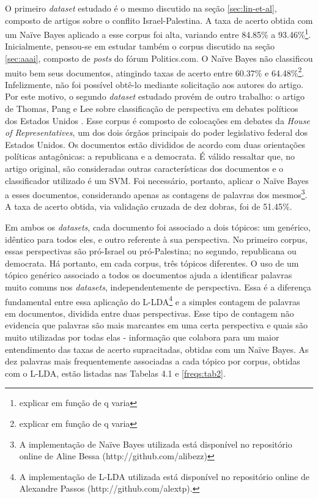 
O primeiro \emph{dataset} estudado é o mesmo discutido na seção \ref{sec:lin-et-al}, composto de artigos sobre o conflito Israel-Palestina. A taxa de acerto obtida com um Naïve Bayes aplicado a esse corpus foi alta, variando entre 84.85\% a 93.46\%\footnote{explicar em função de q varia}. Inicialmente, pensou-se em estudar também o corpus discutido na seção \ref{sec:aaai}, composto de \emph{posts} do fórum Politics.com. O Naïve Bayes não classificou muito bem seus documentos,  atingindo taxas de acerto entre 60.37\% e 64.48\%\footnote{explicar em função de q varia}. Infelizmente, não foi possível obtê-lo mediante solicitação aos autores do artigo. Por este motivo, o segundo \emph{dataset} estudado provém de outro trabalho: o artigo de Thomas, Pang e Lee sobre classificação de perspectiva em debates políticos dos Estados Unidos \cite{get-out-the-vote}. Esse corpus é composto de colocações em debates da \emph{House of Representatives}, um dos dois órgãos principais do poder legislativo federal dos Estados Unidos. Os documentos estão divididos de acordo com duas orientações políticas antagônicas: a republicana e a democrata.  É válido ressaltar que, no artigo original, são consideradas outras características dos documentos e o classificador utilizado é um SVM. Foi necessário, portanto, aplicar o Naïve Bayes a esses documentos, considerando apenas as contagens de palavras dos mesmos\footnote{A implementação de Naïve Bayes utilizada está disponível no repositório online de Aline Bessa (http://github.com/alibezz)}. A taxa de acerto obtida, via validação cruzada de dez dobras, foi de 51.45\%.  


Em ambos os \emph{datasets}, cada documento foi associado a dois tópicos: um genérico, idêntico para todos eles, e outro referente à sua perspectiva. No primeiro corpus, essas perspectivas são pró-Israel ou pró-Palestina; no segundo, republicana ou democrata. Há portanto, em cada corpus, três tópicos diferentes. O uso de um tópico genérico associado a todos os documentos ajuda a identificar palavras muito comuns nos \emph{datasets}, independentemente de perspectiva. Essa é a diferença fundamental entre essa aplicação do L-LDA\footnote{A implementação de L-LDA utilizada está disponível no repositório online de Alexandre Passos (http://github.com/alextp).} e a simples contagem de palavras em documentos, dividida entre duas perspectivas. Esse tipo de contagem não evidencia que palavras são mais marcantes em uma certa perspectiva e quais são muito utilizadas por todas elas - informação que colabora para um maior entendimento das taxas de acerto supracitadas, obtidas com um Naïve Bayes. As dez palavras mais frequentemente associadas a cada tópico por corpus, obtidas com o L-LDA, estão listadas nas Tabelas 4.1 e \ref{freqs:tab2}.

